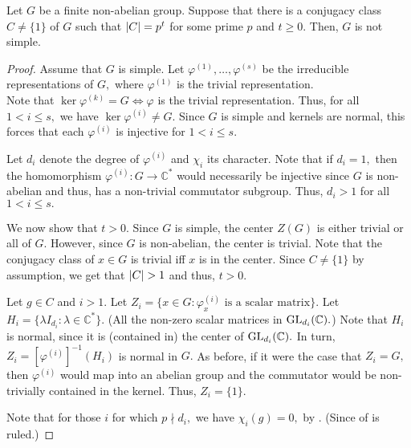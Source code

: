 \begin{lem} 
	Let $G$ be a finite non-abelian group. Suppose that there is a conjugacy class $C \neq \{1\}$ of $G$ such that ${\left\lvert C \right\lvert} = p^t$ for some prime $p$ and $t \ge 0.$ Then, $G$ is not simple.
\end{lem}
\begin{proof} 
	Assume that $G$ is simple. Let $\varphi^{(1)}, \ldots, \varphi^{(s)}$ be the irreducible representations of $G,$ where $\varphi^{(1)}$ is the trivial representation. \\
	Note that $\ker \varphi^{(k)} = G \iff \varphi$ is the trivial representation. Thus, for all $1 < i \le s,$ we have $\ker \varphi^{(i)} \neq G.$ Since $G$ is simple and kernels are normal, this forces that each $\varphi^{(i)}$ is injective for $1 < i \le s.$

	Let $d_i$ denote the degree of $\varphi^{(i)}$ and $\chi_i$ its character. Note that if $d_i = 1,$ then the homomorphism $\varphi^{(i)} : G \to \mathbb{C}^*$ would necessarily be injective since $G$ is non-abelian and thus, has a non-trivial commutator subgroup. Thus, $d_i > 1$ for all $1 < i \le s.$

	We now show that $t > 0.$ Since $G$ is simple, the center $Z(G)$ is either trivial or all of $G.$ However, since $G$ is non-abelian, the center is trivial. Note that the conjugacy class of $x \in G$ is trivial iff $x$ is in the center. Since $C \neq \{1\}$ by assumption, we get that ${\left\lvert C \right\lvert} > 1$ and thus, $t > 0.$

	Let $g \in C$ and $i > 1.$ Let $Z_i = \{x \in G : \varphi^{(i)}_x \text{ is a scalar matrix}\}.$ Let $H_i = \{\lambda I_{d_i} : \lambda \in \mathbb{C}^*\}.$ (All the non-zero scalar matrices in $\operatorname{GL}_{d_i}(\mathbb{C}).$) Note that $H_i$ is normal, since it is (contained in) the center of $\operatorname{GL}_{d_i}(\mathbb{C}).$ In turn, $Z_i = \left[\varphi^{(i)}\right]^{-1}(H_i)$ is normal in $G.$ As before, if it were the case that $Z_i = G,$ then $\varphi^{(i)}$ would map into an abelian group and the commutator would be non-trivially contained in the kernel. Thus, $Z_i = \{1\}.$

	Note that for those $i$ for which $p \nmid d_i,$ we have $\chi_i(g) = 0,$ by . (Since  of  is ruled.)


\end{proof}

